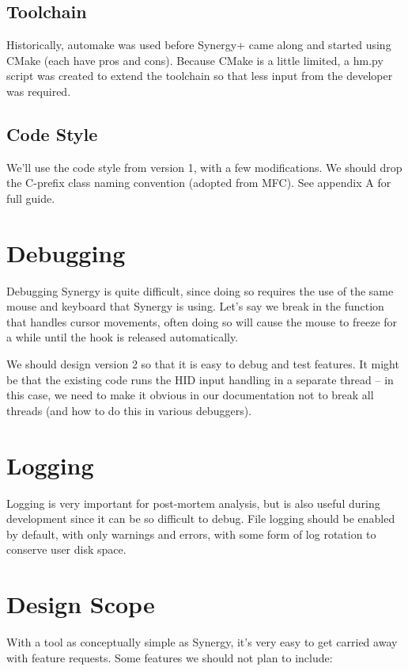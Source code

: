 \documentclass{article}
\begin{document}
\subsection{Toolchain}

Historically, automake was used before Synergy+ came along and started using
CMake (each have pros and cons). Because CMake is a little limited, a hm.py 
script was created to extend the toolchain so that less input from the developer
was required.

\subsection{Code Style}

We'll use the code style from version 1, with a few modifications. We should 
drop the C-prefix class naming convention (adopted from MFC). See appendix A 
for full guide.

\section{Debugging}

Debugging Synergy is quite difficult, since doing so requires the use of the 
same mouse and keyboard that Synergy is using. Let's say we break in the 
function that handles cursor movements, often doing so will cause the mouse
to freeze for a while until the hook is released automatically.

We should design version 2 so that it is easy to debug and test features. It
might be that the existing code runs the HID input handling in a separate 
thread -- in this case, we need to make it obvious in our documentation not to 
break all threads (and how to do this in various debuggers).

\section{Logging}

Logging is very important for post-mortem analysis, but is also useful during
development since it can be so difficult to debug. File logging should be 
enabled by default, with only warnings and errors, with some form of log 
rotation to conserve user disk space.

\section{Design Scope}

With a tool as conceptually simple as Synergy, it's very easy to get carried
away with feature requests. Some features we should not plan to include:
\end{document}
